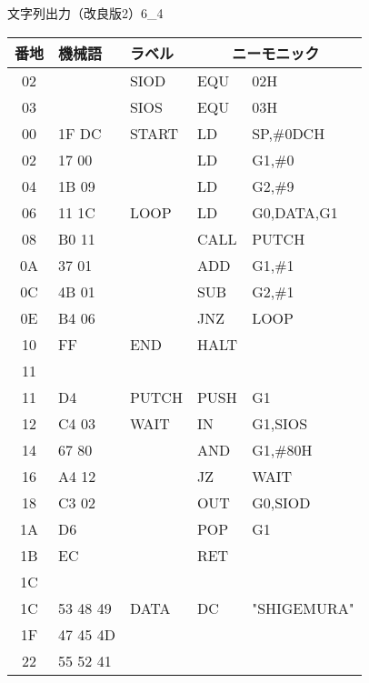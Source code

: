 \begin{figure}[btp]
\begin{reidai}{文字列出力（改良版2）}{6_4}
\begin{description}
{\tt\footnotesize\begin{center}
\begin{tabular}{|c|l|l|l l|} \hline
番地 & 機械語 & ラベル & \multicolumn{2}{|c|}{ニーモニック} \\
\hline
02 &       & SIOD  & EQU  & 02H             \\
03 &       & SIOS  & EQU  & 03H             \\
00 & 1F DC & START & LD   & SP,\#0DCH       \\
02 & 17 00 &       & LD   & G1,\#0          \\
04 & 1B 09 &       & LD   & G2,\#9          \\
06 & 11 1C & LOOP  & LD   & G0,DATA,G1      \\
08 & B0 11 &       & CALL & PUTCH           \\
0A & 37 01 &       & ADD  & G1,\#1          \\
0C & 4B 01 &       & SUB  & G2,\#1          \\
0E & B4 06 &       & JNZ  & LOOP            \\
10 & FF    & END   & HALT &                 \\
11 &       &       &      &                 \\
11 & D4    & PUTCH & PUSH & G1              \\
12 & C4 03 & WAIT  & IN   & G1,SIOS         \\
14 & 67 80 &       & AND  & G1,\#80H        \\
16 & A4 12 &       & JZ   & WAIT            \\
18 & C3 02 &       & OUT  & G0,SIOD         \\
1A & D6    &       & POP  & G1              \\
1B & EC    &       & RET  &                 \\
1C &       &       &      &                 \\
1C & 53 48 49 & DATA  & DC   & "SHIGEMURA"     \\
1F & 47 45 4D &       &      &                 \\
22 & 55 52 41 &       &      &                 \\
\hline
\end{tabular}
\end{center}}
\end{description}
\end{reidai}
\end{figure}

